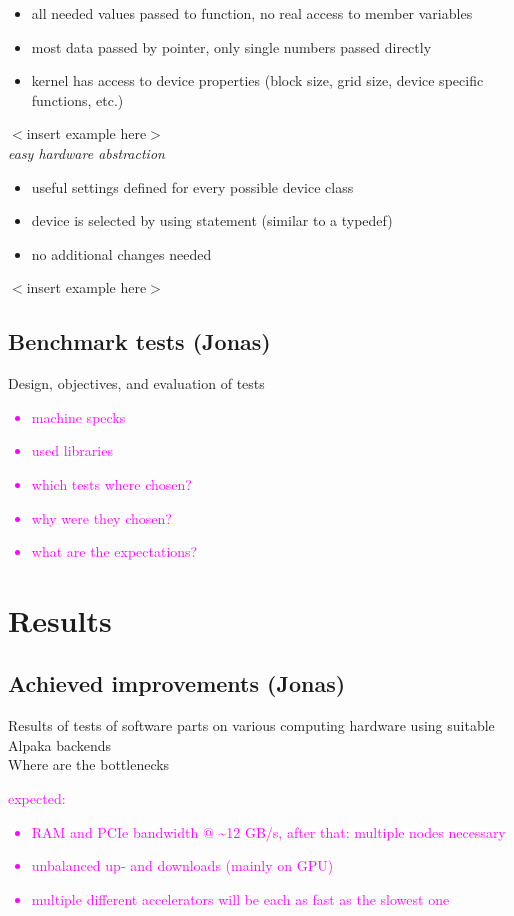 \documentclass[a4paper]{article}
\begin{document}
{\begin{itemize}
	\item all needed values passed to function, no real access to member variables
	\item most data passed by pointer, only single numbers passed directly
	\item kernel has access to device properties (block size, grid size, device specific functions, etc.)
\end{itemize}
$<$insert example here$>$\\
\textit{easy hardware abstraction}
\begin{itemize}
	\item useful settings defined for every possible device class
	\item device is selected by using statement (similar to a typedef)
	\item no additional changes needed
\end{itemize}
$<$insert example here$>$
}


\subsection{Benchmark tests (Jonas)}
\label{subsec:benchmark}
Design, objectives, and evaluation of tests

\textcolor{magenta}{
\begin{itemize}
	\item machine specks
	\item used libraries
	\item which tests where chosen?
	\item why were they chosen?
	\item what are the expectations?
\end{itemize}
}

\section{Results}
\label{sec:results}
\subsection{Achieved improvements (Jonas)}
Results of tests of software parts on various computing hardware using suitable Alpaka backends\\

Where are the bottlenecks\\

\textcolor{magenta}{
expected:
\begin{itemize}
	\item RAM and PCIe bandwidth @ \textasciitilde12 GB/s, after that: multiple nodes necessary
	\item unbalanced up- and downloads (mainly on GPU)
	\item multiple different accelerators will be each as fast as the slowest one
\end{itemize}
}
\end{document}
